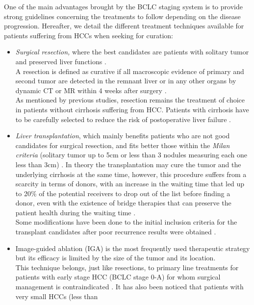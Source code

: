 \documentclass[]{article}
\begin{document}
One of the main advantages brought by the BCLC staging system is
to provide strong guidelines concerning the treatments to follow
depending on the disease progression.
Hereafter, we detail the different treatment techniques available for
patients suffering from HCCs when seeking for curation:
\begin{itemize}
\item \emph{Surgical resection,} where the best candidates are patients with
  solitary tumor and preserved liver functions \cite{Forner2018}.\\
  A resection is defined as curative if all macroscopic evidence of
  primary and second tumor are detected in the remnant liver or in any
  other organs by dynamic CT or MR within 4 weeks after surgery
  \cite{Yang2012}.\\
  As mentioned by previous studies, resection remains the treatment of
  choice in patients without cirrhosis suffering from HCC. Patients with
  cirrhosis have to be carefully selected to reduce the risk of
  postoperative liver failure \cite{Bruix2011,Llovet2012,Verslype2012}.
\item
  \emph{Liver transplantation}, which mainly benefits patients who are
  not good candidates for surgical resection, and fits better those
  within the \emph{Milan criteria} (solitary tumor up to 5cm or less
  than 3 nodules measuring each one less than 3cm) \cite{Llovet2012,Mazzaferro2011}. In theory the transplantation may cure the
  tumor and the underlying cirrhosis at the same time, however, this
  procedure suffers from a scarcity in terms of donors, with an increase
  in the waiting time that led up to 20\% of the potential receivers to
  drop out of the list before finding a donor, even with the existence
  of bridge therapies that can preserve the patient health during the
  waiting time \cite{Llovet1999}.\\
  Some modifications have been done to the initial inclusion criteria
  for the transplant candidates after poor recurrence results were
  obtained \cite{Llovet2012}.
\item Image-guided ablation (IGA) is the most frequently used
  therapeutic strategy but its efficacy is limited by the size of the
  tumor and its location.\\
  This technique belongs, just like resections, to primary line
  treatments for patients with early stage HCC (BCLC stage 0-A)
  for whom surgical management is contraindicated \cite{Bruix2011,Heimbach2018}. It has
  also been noticed that patients with very small HCCs (less than

\end{itemize}
\end{document}
